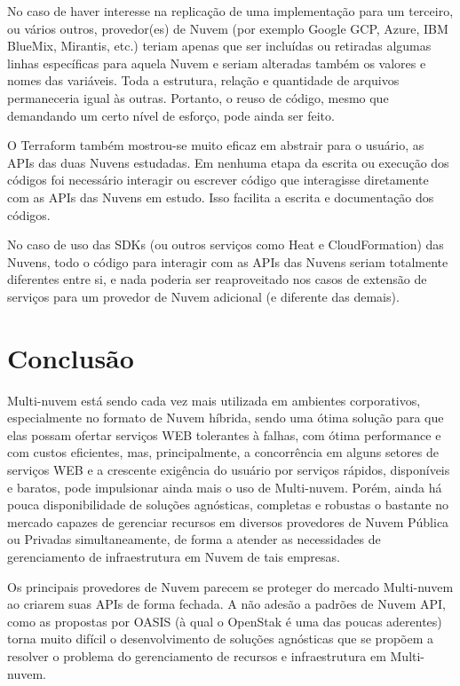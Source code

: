 \documentclass[12pt]{article}
\begin{document}
	No caso de haver interesse na replicação de uma implementação para um terceiro, ou vários outros, provedor(es) de Nuvem (por exemplo Google GCP, Azure, IBM BlueMix, Mirantis, etc.) teriam apenas que ser incluídas ou retiradas algumas linhas específicas para aquela Nuvem e seriam alteradas também os valores e nomes das variáveis. Toda a estrutura, relação e quantidade de arquivos permaneceria igual às outras. Portanto, o reuso de código, mesmo que demandando um certo nível de esforço, pode ainda ser feito. 
	
	O Terraform também mostrou-se muito eficaz em abstrair para o usuário, as APIs das duas Nuvens estudadas. Em nenhuma etapa da escrita ou execução dos códigos foi necessário interagir ou escrever código que interagisse diretamente com as APIs das Nuvens em estudo. Isso facilita a escrita e documentação dos códigos.
	
	No caso de uso das SDKs (ou outros serviços como Heat e CloudFormation) das Nuvens, todo o código para interagir com as APIs das Nuvens seriam totalmente diferentes entre si, e nada poderia ser reaproveitado nos casos de extensão de serviços para um provedor de Nuvem adicional (e diferente das demais). 		
	
	\section{Conclusão}
	
	Multi-nuvem está sendo cada vez mais utilizada em ambientes corporativos, especialmente no formato de Nuvem híbrida, sendo uma ótima solução para que elas possam ofertar serviços WEB tolerantes à falhas, com ótima performance e com custos eficientes, mas, principalmente, a concorrência em alguns setores de serviços WEB e a crescente exigência do usuário por serviços rápidos, disponíveis e baratos, pode impulsionar ainda mais o uso de Multi-nuvem. Porém, ainda há pouca disponibilidade de soluções agnósticas, completas e robustas o bastante no mercado capazes de gerenciar recursos em diversos provedores de Nuvem Pública ou Privadas simultaneamente, de forma a atender as necessidades de gerenciamento de infraestrutura em Nuvem de tais empresas.
	
	Os principais provedores de Nuvem parecem se proteger do mercado Multi-nuvem ao criarem suas APIs de forma fechada. A não adesão a padrões de Nuvem API, como as propostas por OASIS \cite{CAMP:2019} (à qual o OpenStak é uma das poucas aderentes) torna muito difícil o desenvolvimento de soluções agnósticas que se propõem a resolver o problema do gerenciamento de recursos e infraestrutura em Multi-nuvem.
		
\end{document}
